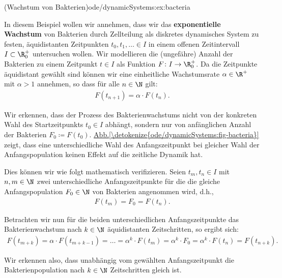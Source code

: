 \documentclass[letterpaper,10pt,german]{jupyterBook}
\begin{document}
\begin{example}{(Wachstum von Bakterien)}{ode/dynamicSystems:ex:bacteria}



\par
In diesem Beispiel wollen wir annehmen, dass wir das \textbf{exponentielle Wachstum} von Bakterien durch Zellteilung als diskretes dynamisches System zu festen, äquidistanten Zeitpunkten \(t_0, t_1, \ldots \in I\) in einem offenen Zeitintervall \(I\subset\R^+_0\) untersuchen wollen.
Wir modellieren die (ungefähre) Anzahl der Bakterien zu einem Zeitpunkt \(t \in I\) als Funktion \(F \colon I \rightarrow \R_0^+\).
Da die Zeitpunkte äquidistant gewählt sind können wir eine einheitliche Wachstumsrate \(\alpha \in \R^+\) mit \(\alpha > 1\) annehmen, so dass für alle \(n \in \N\) gilt:
\begin{align*}
F(t_{n+1}) = \alpha \cdot F(t_n).
\end{align*}
\par
Wir erkennen, dass der Prozess des Bakterienwachstums nicht von der konkreten Wahl des Startzeitpunkts \(t_0 \in I\) abhängt, sondern nur von anfänglichen Anzahl der Bakterien \(F_0 \coloneqq F(t_0)\). \hyperref[\detokenize{ode/dynamicSystems:fig-bacteria}]{Abb.\@ \ref{\detokenize{ode/dynamicSystems:fig-bacteria}}} zeigt, dass eine unterschiedliche Wahl des Anfangszeitpunkt bei gleicher Wahl der Anfangspopulation keinen Effekt auf die zeitliche Dynamik hat.

\par
Dies können wir wie folgt mathematisch verifizieren. Seien \(t_m, t_n \in I\) mit \(n,m \in \N\) zwei unterschiedliche Anfangszeitpunkte für die die gleiche Anfangspopulation \(F_0 \in \N\) von Bakterien angenommen wird, d.h.,
\begin{align*}
F(t_m) = F_0 = F(t_n).
\end{align*}
\par
Betrachten wir nun für die beiden unterschiedlichen Anfangszeitpunkte das Bakterienwachstum nach \(k \in \N\) äquidistanten Zeitschritten, so ergibt sich:
\begin{align*}
F(t_{m+k}) = \alpha \cdot F(t_{m+k-1}) = \ldots = \alpha^k \cdot F(t_{m}) = \alpha^k \cdot F_0 = \alpha^k \cdot F(t_n) = F(t_{n+k}).
\end{align*}
\par
Wir erkennen also, dass unabhängig vom gewählten Anfangszeitpunkt die Bakterienpopulation nach \(k \in \N\) Zeitschritten gleich ist.
\end{example}
\end{document}
